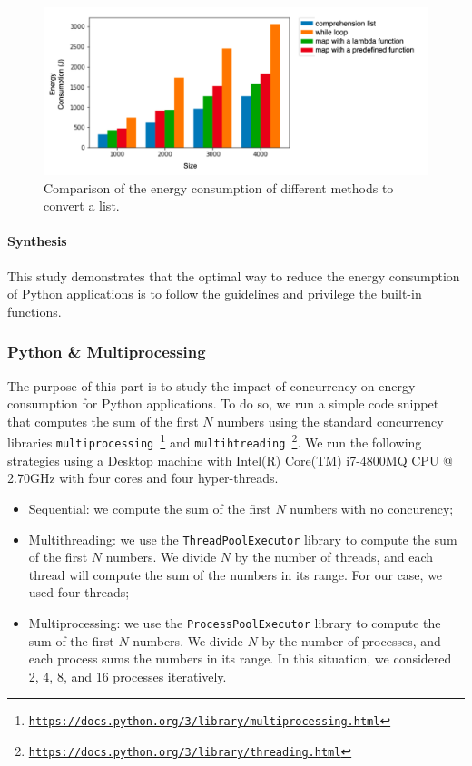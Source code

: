 \begin{figure}
    \centering
    \includegraphics[width=.9\linewidth]{imgs/python_treatemens}
    \caption{Comparison of the energy consumption of different methods to convert a list.}
    \label{fig:pythontreatement}
\end{figure}


\paragraph*{Synthesis}
This study demonstrates that the optimal way to reduce the energy consumption of Python applications is to follow the guidelines and privilege the built-in functions.


\subsubsection{Python \& Multiprocessing}
The purpose of this part is to study the impact of concurrency on energy consumption for Python applications.
To do so, we run a simple code snippet that computes the sum of the first $N$ numbers using the standard concurrency libraries \texttt{multiprocessing~\footnote{\url{https://docs.python.org/3/library/multiprocessing.html}}} and \texttt{multihtreading~\footnote{\url{https://docs.python.org/3/library/threading.html}}}.
We run the following strategies using a Desktop machine with Intel(R) Core(TM) i7-4800MQ CPU @ 2.70GHz with four cores and four hyper-threads.
\begin{itemize}
    \item \textsf{Sequential}: we compute the sum of the first $N$ numbers with no concurency;
    \item \textsf{Multithreading}: we use the \texttt{ThreadPoolExecutor} library to compute the sum of the first $N$ numbers. We divide $N$ by the number of threads, and each thread will compute the sum of the numbers in its range. For our case, we used four threads;
    \item \textsf{Multiprocessing}: we use the \texttt{ProcessPoolExecutor} library to compute the sum of the first $N$ numbers. We divide $N$ by the number of processes, and each process sums the numbers in its range. In this situation, we considered 2, 4, 8, and 16 processes iteratively.
\end{itemize}

